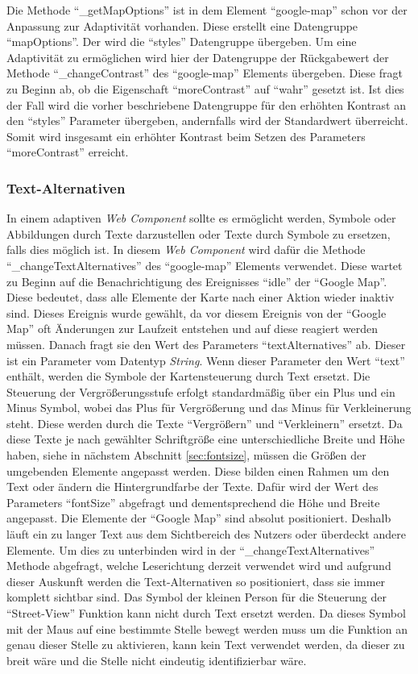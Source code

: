 \documentclass[12pt, paper=a4, bibtotoc, toc=listof, headsepline=true, numbers=endperiod]{scrreprt}
\begin{document}
Die Methode \enquote{\_getMapOptions} ist in dem Element \enquote{google-map} schon vor der Anpassung zur Adaptivität vorhanden. Diese erstellt eine Datengruppe \enquote{mapOptions}. Der wird die \enquote{styles} Datengruppe übergeben. Um eine Adaptivität zu ermöglichen wird hier der Datengruppe der Rückgabewert der Methode \enquote{\_changeContrast} des \enquote{google-map} Elements übergeben. Diese fragt zu Beginn ab, ob die Eigenschaft \enquote{moreContrast} auf \enquote{wahr} gesetzt ist. Ist dies der Fall wird die vorher beschriebene Datengruppe für den erhöhten Kontrast an den \enquote{styles} Parameter übergeben, andernfalls wird der Standardwert überreicht. Somit wird insgesamt ein erhöhter Kontrast beim Setzen des Parameters \enquote{moreContrast} erreicht. 
	\subsubsection{Text-Alternativen}
	In einem adaptiven \emph{Web Component} sollte es ermöglicht werden, Symbole oder Abbildungen durch Texte darzustellen oder Texte durch Symbole zu ersetzen, falls dies möglich ist. In diesem \emph{Web Component} wird dafür die Methode \enquote{\_changeTextAlternatives} des \enquote{google-map} Elements verwendet. Diese wartet zu Beginn auf die Benachrichtigung des Ereignisses \enquote{idle} der \enquote{Google Map}. Diese bedeutet, dass alle Elemente der Karte nach einer Aktion wieder inaktiv sind. Dieses Ereignis wurde gewählt, da vor diesem Ereignis von der \enquote{Google Map} oft Änderungen zur Laufzeit entstehen und auf diese reagiert werden müssen. Danach fragt sie den Wert des Parameters \enquote{textAlternatives} ab. Dieser ist ein Parameter vom Datentyp \emph{String}. Wenn dieser Parameter den Wert \enquote{text} enthält, werden die Symbole der Kartensteuerung durch Text ersetzt. Die Steuerung der Vergrößerungsstufe erfolgt standardmäßig über ein Plus und ein Minus Symbol, wobei das Plus für Vergrößerung und das Minus für Verkleinerung steht. Diese werden durch die Texte \enquote{Vergrößern} und \enquote{Verkleinern} ersetzt. Da diese Texte je nach gewählter Schriftgröße eine unterschiedliche Breite und Höhe haben, siehe in nächstem Abschnitt \ref{sec:fontsize}, müssen die Größen der umgebenden Elemente angepasst werden. Diese bilden einen Rahmen um den Text oder ändern die Hintergrundfarbe der Texte. Dafür wird der Wert des Parameters \enquote{fontSize} abgefragt und dementsprechend die Höhe und Breite angepasst. Die Elemente der \enquote{Google Map} sind absolut positioniert. Deshalb läuft ein zu langer Text aus dem Sichtbereich des Nutzers oder überdeckt andere Elemente. Um dies zu unterbinden wird in der \enquote{\_changeTextAlternatives} Methode abgefragt, welche Leserichtung derzeit verwendet wird und aufgrund dieser Auskunft werden die Text-Alternativen so positioniert, dass sie immer komplett sichtbar sind. Das Symbol der kleinen Person für die Steuerung der \enquote{Street-View} Funktion kann nicht durch Text ersetzt werden. Da dieses Symbol mit der Maus auf eine bestimmte Stelle bewegt werden muss um die Funktion an genau dieser Stelle zu aktivieren, kann kein Text verwendet werden, da dieser zu breit wäre und die Stelle nicht eindeutig identifizierbar wäre. 
\end{document}

